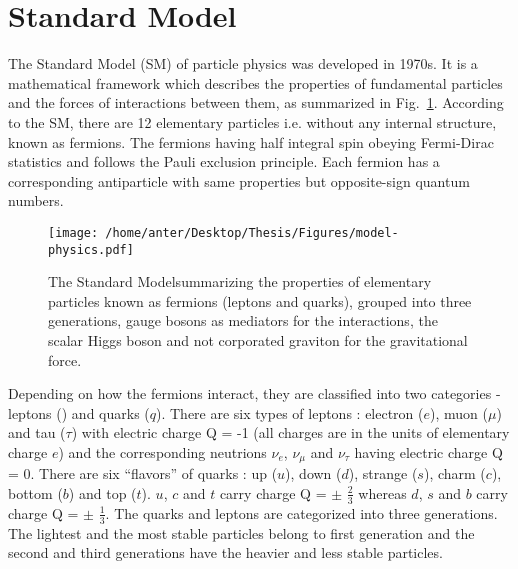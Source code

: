 \section{Standard Model}
The Standard Model (SM) of particle physics \cite{Perkins:1982xb,Herrero:1998eq,Weinberg:1967tq} was developed in 1970s. It is a mathematical framework which describes the properties of fundamental particles and the forces of interactions between them, as summarized in Fig.~\ref{fig:SM}. According to the SM, there are 12 elementary particles i.e. without any internal structure, known as fermions. The fermions having half integral spin obeying Fermi-Dirac statistics and follows the Pauli exclusion principle. Each fermion has a corresponding antiparticle with same properties but opposite-sign quantum numbers.
\begin{figure}[!h]
\begin{center}
\hspace*{-15mm}
\texttt{[image: /home/anter/Desktop/Thesis/Figures/model-physics.pdf]}\\
\caption[SM]{The Standard Model\footnotemark summarizing the properties of elementary particles known as fermions (leptons and quarks), grouped into three generations, gauge bosons as mediators for the interactions, the scalar Higgs boson and not corporated graviton for the gravitational force.}
\label{fig:SM}
\end{center}
\end{figure}
Depending on how the fermions interact, they are classified into two categories - leptons (\sln) and quarks ($q$). There are six types of leptons : electron ($e$), muon ($\mu$) and tau ($\tau$) with  electric charge Q = -1 (all charges are in the units of elementary charge $e$) and the corresponding neutrions $\nu_e$, $\nu_\mu$ and $\nu_\tau$ having electric charge Q = 0. There are six ``flavors'' of quarks : up ($u$), down ($d$), strange ($s$), charm ($c$), bottom ($b$) and top ($t$). $u$, $c$ and $t$ carry charge Q = $\pm$ $\frac{2}{3}$ whereas $d$, $s$ and $b$ carry charge Q = $\pm$ $\frac{1}{3}$. The quarks and leptons are categorized into three generations. The lightest and the most stable particles belong to first generation and the second and third generations have the heavier and less stable particles.

